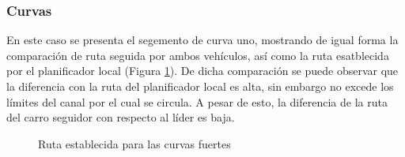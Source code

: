 \subsubsection{Curvas}
En este caso se presenta el segemento de curva uno, mostrando de igual forma la comparación de ruta seguida por ambos vehículos, así como la ruta esatblecida por el planificador local (Figura \ref{fig:rcf}). De dicha comparación se puede observar que la diferencia con la ruta del planificador local es alta, sin embargo no excede los límites del canal por el cual se circula. A pesar de esto, la diferencia de la ruta del carro seguidor con respecto al líder es baja.\\

 \begin{figure}[H]
 \centering
 \caption{Ruta establecida para las curvas fuertes}
 \label{fig:rcf}
\end{figure}

